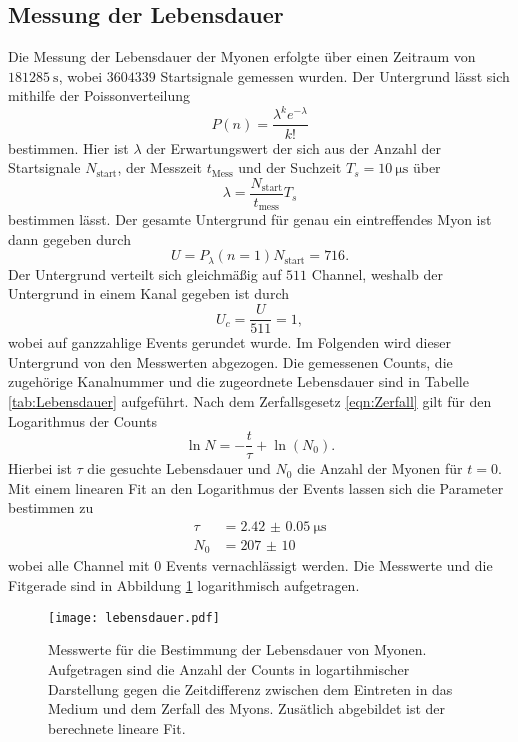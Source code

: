\subsection{Messung der Lebensdauer}
Die Messung der Lebensdauer der Myonen erfolgte über einen Zeitraum von $\SI{181285}{\second}$, wobei $3604339$ Startsignale gemessen wurden. 
Der Untergrund lässt sich mithilfe der Poissonverteilung 
\begin{equation*}
    P(n) = \frac{\lambda^k e^{-\lambda}}{k!}
\end{equation*}
bestimmen. Hier ist $\lambda$ der Erwartungswert der sich aus der Anzahl der Startsignale $N_\text{start}$, der Messzeit $t_\text{Mess}$ und der Suchzeit $T_s = \SI{10}{\micro\second}$ über 
\begin{equation*}
    \lambda = \frac{N_\text{start}}{t_\text{mess}} T_s  
\end{equation*}
bestimmen lässt. Der gesamte Untergrund für genau ein eintreffendes Myon ist dann gegeben durch 
\begin{equation*}
    U = P_{\lambda}(n=1) N_{\text{start}} = \num{716}  .
\end{equation*}
Der Untergrund verteilt sich gleichmäßig auf $511$ Channel, weshalb der Untergrund in einem Kanal gegeben ist durch 
\begin{equation*}
    U_c = \frac{U}{511} =\num{1}  ,
\end{equation*}
wobei auf ganzzahlige Events gerundet wurde.
Im Folgenden wird dieser Untergrund von den Messwerten abgezogen.
Die gemessenen Counts, die zugehörige Kanalnummer und die zugeordnete Lebensdauer sind in Tabelle \ref{tab:Lebensdauer} aufgeführt.
Nach dem Zerfallsgesetz \ref{eqn:Zerfall} gilt für den Logarithmus der Counts 
\begin{equation*}
    \ln N = -\frac{t}{\tau} + \ln(N_0).
\end{equation*}
Hierbei ist $\tau $ die gesuchte Lebensdauer und $N_0$ die Anzahl der Myonen für $t=0$. Mit einem linearen Fit an den Logarithmus der Events lassen sich die Parameter bestimmen zu 
\begin{align*}
    \tau &= \SI{2.42(5)}{\micro\second} \\
    N_0 &= \num{207(10)}
\end{align*}
wobei alle Channel mit $0$ Events vernachlässigt werden.
Die Messwerte und die Fitgerade sind in Abbildung \ref{fig:Lebensdauer} logarithmisch aufgetragen.
\begin{figure}
    \centering 
    \texttt{[image: lebensdauer.pdf]}
    \caption{Messwerte für die Bestimmung der Lebensdauer von Myonen. Aufgetragen sind die Anzahl der Counts in logartihmischer Darstellung gegen die 
    Zeitdifferenz zwischen dem Eintreten in das Medium und dem Zerfall des Myons. 
    Zusätlich abgebildet ist der berechnete lineare Fit.}
    \label{fig:Lebensdauer}
\end{figure}

